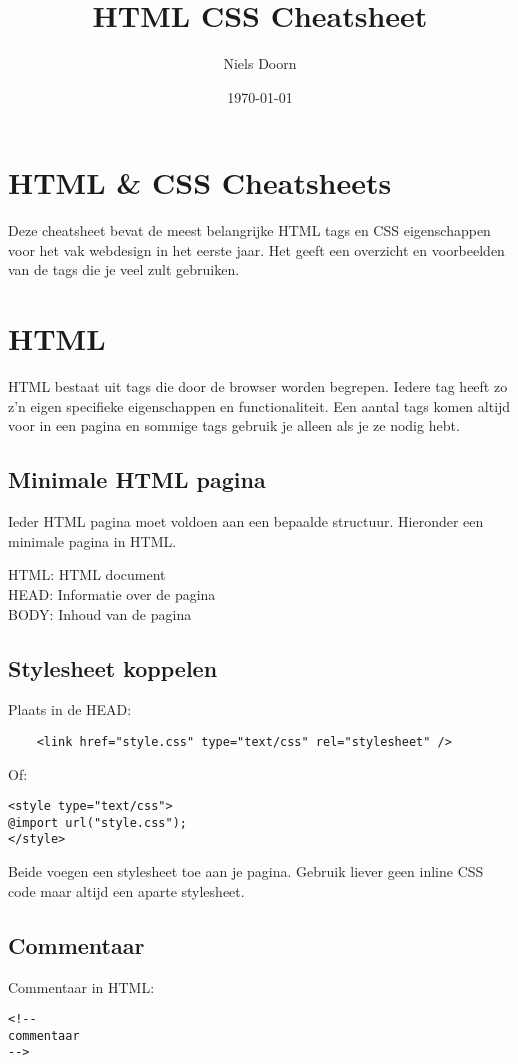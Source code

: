 \documentclass[8pt,pagesize,footinclude=false,headinclude=false]{scrartcl}
\title{HTML CSS Cheatsheet}
\author{Niels Doorn}
\date{\today}
\begin{document}
\ifpdf
{}
\else
{}
\fi

\begin{multicols*}{4}

\section*{HTML \& CSS Cheatsheets}
Deze cheatsheet bevat de meest belangrijke HTML tags en CSS eigenschappen voor het vak webdesign in het eerste jaar. Het geeft een overzicht en voorbeelden van de tags die je veel zult gebruiken.

\section*{HTML}
HTML bestaat uit tags die door de browser worden begrepen. Iedere tag heeft zo z'n eigen specifieke eigenschappen en functionaliteit. Een aantal tags komen altijd voor in een pagina en sommige tags gebruik je alleen als je ze nodig hebt.
\subsection*{Minimale HTML pagina}
Ieder HTML pagina moet voldoen aan een bepaalde structuur. Hieronder een minimale pagina in HTML.

HTML: HTML document\\
HEAD: Informatie over de pagina\\
BODY: Inhoud van de pagina

\subsection*{Stylesheet koppelen}
Plaats in de HEAD:
\begin{lstlisting}
	<link href="style.css" type="text/css" rel="stylesheet" />
\end{lstlisting}
\noindent Of:
\begin{lstlisting}
<style type="text/css">
@import url("style.css");
</style>
\end{lstlisting}
\noindent Beide voegen een stylesheet toe aan je pagina. Gebruik liever geen inline CSS code maar altijd een aparte stylesheet.

\subsection*{Commentaar}
Commentaar in HTML:
\begin{lstlisting}
<!--
commentaar
-->
\end{lstlisting}


\end{multicols*}
\end{document}
